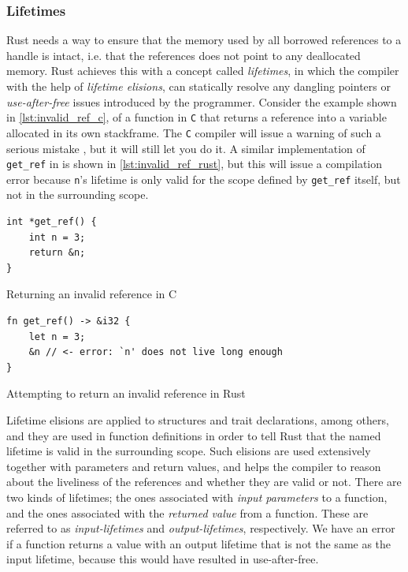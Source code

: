 \subsubsection{Lifetimes}

Rust needs a way to ensure that the memory used by all borrowed references to a handle is intact, i.e. that the references does not point to any deallocated memory.
Rust achieves this with a concept called \emph{lifetimes}, in which the compiler with the help of \emph{lifetime elisions}, can statically resolve any dangling pointers or \emph{use-after-free} issues introduced by the programmer.
Consider the example shown in \autoref{lst:invalid_ref_c}, of a function in \texttt{C} that returns a reference into a variable allocated in its own stackframe.
The \texttt{C} compiler will issue a warning of such a serious mistake , but it will still let you do it.
A similar implementation of \texttt{get\_ref} in \rust is shown in \autoref{lst:invalid_ref_rust}, but this will issue a compilation error because \texttt{n}'s lifetime is only valid for the scope defined by \texttt{get\_ref} itself, but not in the surrounding scope.

\begin{listing}[tb]
\begin{verbatim}
int *get_ref() {
    int n = 3;
    return &n;
}
\end{verbatim}
\caption{Returning an invalid reference in C}
\label{lst:invalid_ref_c}
\end{listing}

\begin{listing}[tb]
\begin{verbatim}
fn get_ref() -> &i32 {
    let n = 3;
    &n // <- error: `n' does not live long enough
}
\end{verbatim}
\caption{Attempting to return an invalid reference in Rust}
\label{lst:invalid_ref_rust}
\end{listing}

Lifetime elisions are applied to structures and trait declarations, among others, and they are used in function definitions in order to tell Rust that the named lifetime is valid in the surrounding scope.
Such elisions are used extensively together with parameters and return values, and helps the compiler to reason about the liveliness of the references and whether they are valid or not.
There are two kinds of lifetimes; the ones associated with \emph{input parameters} to a function, and the ones associated with the \emph{returned value} from a function.
These are referred to as \emph{input-lifetimes} and \emph{output-lifetimes}, respectively.
We have an error if a function returns a value with an output lifetime that is not the same as the input lifetime, because this would have resulted in use-after-free.

